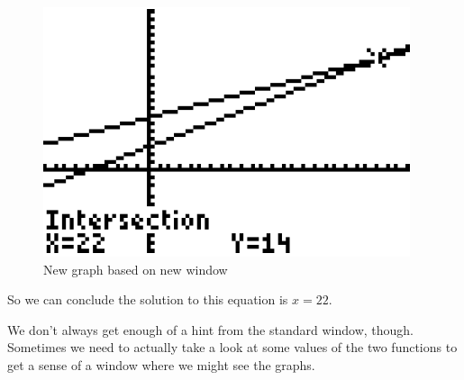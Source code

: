 {	\begin{figure}[H]
		\centering
		\includegraphics[scale=1.0]{Sections/SolvingEquationsGraphically/Figure20.png}
		\caption{New graph based on new window}
	\end{figure}
	
	So we can conclude the solution to this equation is $x=22$.
}

We don’t always get enough of a hint from the standard window, though. Sometimes we need to actually take a look at some values of the two functions to get a sense of a window where we might see the graphs.


